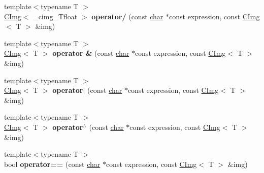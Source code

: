 \begin{DoxyCompactItemize}
\mbox{\label{namespacecimg__library__suffixed_af2bdc1f26a64adc01b8d8c61df639568}} 
{\footnotesize template$<$typename T $>$ }\\\hyperlink{structcimg__library__suffixed_1_1CImg}{C\+Img}$<$ \+\_\+cimg\+\_\+\+Tfloat $>$ {\bfseries operator/} (const \hyperlink{classchar}{char} $\ast$const expression, const \hyperlink{structcimg__library__suffixed_1_1CImg}{C\+Img}$<$ T $>$ \&img)
\item 
\mbox{\label{namespacecimg__library__suffixed_a16fa192f769ac2f7eb7f916fee3c4d5f}} 
{\footnotesize template$<$typename T $>$ }\\\hyperlink{structcimg__library__suffixed_1_1CImg}{C\+Img}$<$ T $>$ {\bfseries operator \&} (const \hyperlink{classchar}{char} $\ast$const expression, const \hyperlink{structcimg__library__suffixed_1_1CImg}{C\+Img}$<$ T $>$ \&img)
\item 
\mbox{\label{namespacecimg__library__suffixed_ae21cfd5e27421ddba3574b10ef087b19}} 
{\footnotesize template$<$typename T $>$ }\\\hyperlink{structcimg__library__suffixed_1_1CImg}{C\+Img}$<$ T $>$ {\bfseries operator$\vert$} (const \hyperlink{classchar}{char} $\ast$const expression, const \hyperlink{structcimg__library__suffixed_1_1CImg}{C\+Img}$<$ T $>$ \&img)
\item 
\mbox{\label{namespacecimg__library__suffixed_aee149205a6148f93291406eb301e4710}} 
{\footnotesize template$<$typename T $>$ }\\\hyperlink{structcimg__library__suffixed_1_1CImg}{C\+Img}$<$ T $>$ {\bfseries operator$^\wedge$} (const \hyperlink{classchar}{char} $\ast$const expression, const \hyperlink{structcimg__library__suffixed_1_1CImg}{C\+Img}$<$ T $>$ \&img)
\item 
\mbox{\label{namespacecimg__library__suffixed_aab2a4105be9672849d2255c8732eadc6}} 
{\footnotesize template$<$typename T $>$ }\\bool {\bfseries operator==} (const \hyperlink{classchar}{char} $\ast$const expression, const \hyperlink{structcimg__library__suffixed_1_1CImg}{C\+Img}$<$ T $>$ \&img)
\item 
\mbox{\label{namespacecimg__library__suffixed_a5ded9f4e593e6dd9f597b6fef66b8133}} 

\end{DoxyCompactItemize}
